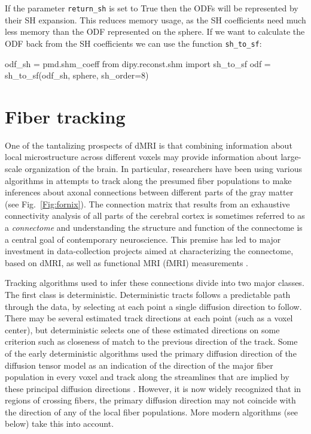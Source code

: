 \documentclass{bioinfo}
\begin{document}
If the parameter \texttt{return\_sh} is set to True then the ODFs will be
represented by their SH expansion. This reduces memory usage, as the SH coefficients need much less memory than the ODF represented
on the sphere. If we want to calculate the ODF back from the SH coefficients we
can use the function \texttt{sh\_to\_sf}:
\begin{python}
odf_sh = pmd.shm_coeff
from dipy.reconst.shm import sh_to_sf
odf = sh_to_sf(odf_sh, sphere, sh_order=8)
\end{python}

\section{Fiber tracking}\label{fiber_tracking}
One of the tantalizing prospects of dMRI is that combining
information about local microstructure across different voxels may provide
information about large-scale organization of the brain. In particular,
researchers have been using various algorithms in attempts to track along the
presumed fiber populations to make inferences about axonal connections between
different parts of the gray matter (see Fig.~\ref{Fig:fornix}). The connection matrix that results from an
exhaustive connectivity analysis of all parts of the cerebral cortex is
sometimes referred to as a \emph{connectome} \citep{sporns2005} and understanding
the structure and function of the connectome is a central goal of contemporary
neuroscience. This premise has led to major investment in data-collection
projects aimed at characterizing the connectome, based on dMRI, as well as
functional MRI (fMRI) measurements \citep{VanEssen2013}.

Tracking algorithms used to infer these connections divide into two major
classes. The first class is deterministic. Deterministic tracts follows a
predictable path through the data, by selecting at each point a single diffusion
direction to follow.  There may be several estimated track directions at each
point (such as a voxel center), but deterministic selects one of these estimated
directions on some criterion such as closeness of match to the previous
direction of the track.
Some of the early deterministic algorithms used the
primary diffusion direction of the diffusion tensor model as an indication of the direction
of the major fiber population in every voxel and track along the streamlines
that are implied by these principal diffusion directions \citep{Mori1999,
  conturo-lori-etal:99, basser-pajevic-etal:00} . However, it is
now widely recognized that in regions of crossing fibers, the primary diffusion
direction may not coincide with the direction of any of the local fiber
populations. More modern algorithms (see below) take this into account.
\end{document}
